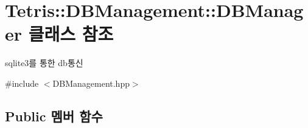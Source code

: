 \hypertarget{class_tetris_1_1_d_b_management_1_1_d_b_manager}{}\section{Tetris\+:\+:D\+B\+Management\+:\+:D\+B\+Manager 클래스 참조}
\label{class_tetris_1_1_d_b_management_1_1_d_b_manager}


sqlite3를 통한 db통신  




{\ttfamily \#include $<$D\+B\+Management.\+hpp$>$}

\subsection*{Public 멤버 함수}
